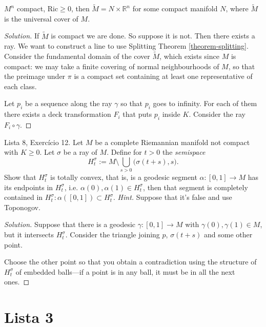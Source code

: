 \begin{exercise}
\label{exercise-product-of-compact-and-Rn}
$M^n$ compact, $\text{Ric} \geq 0$, then $\tilde{M}=N \times \mathbb{R}^n$ for
some compact manifold $N$, where  $\tilde{M}$ is the universal cover of $M$.
\end{exercise}

\begin{proof}[Solution]
If $\tilde{M}$ is compact we are done. So suppose it is not. Then there exists a
ray. We want to construct a line to use Splitting Theorem \ref{theorem-splitting}.
Consider the fundamental domain of the cover $\tilde{M}$, which exists since
$M$ is compact: we may take a finite covering of normal neighbourhoods of $M$,
so that the preimage under $\pi$ is a compact set containing at least one
representative of each class.

Let $p_i$ be a sequence along the ray $\gamma$ so that $p_i$ goes to infinity.
For each of them there exists a deck transformation $F_i$ that puts $p_i$ inside
$K$. Consider the ray $F_i \circ \gamma$.
\end{proof}

\begin{exercise}
\label{exercise-rays-semispaces}
Lista 8, Exercício 12. Let $M$ be a complete Riemannian manifold not compact
with $K \geq 0$. Let $\sigma$ be a ray of $M$. Define for $t>0$ the {\it
semispace}
$$
H_t^{\sigma}:=M\setminus \bigcup_{s>0}\Big(\sigma(t+s),s).
$$
Show that $H_t^{\sigma}$ is totally convex, that is, is a geodesic segment 
 $\alpha:[0,1]\to M$ has its endpoints in $H_t^{\sigma}$, i.e.
$\alpha(0),\alpha(1) \in H_t^{\sigma}$, then that segment is completely
contained in $H_t^{\sigma}:\alpha([0,1]) \subset H_t^{\sigma}$. {\it Hint.}
Suppose that it's false and use Toponogov.
\end{exercise}

\begin{proof}[Solution]
Suppose that there is a geodesic $\gamma:[0,1]\to M$ with $\gamma(0),\gamma(1)
\in M$, but it intersects $H_t^{\sigma}$. Consider the triangle joining $p$,
$\sigma(t+s)$ and some other point.

Choose the other point so that you obtain a contradiction using the structure of
$H_t^{\sigma}$ of embedded balls---if a point is in any ball, it must be in all
the next ones.
\end{proof}

\section{Lista 3}
\label{section-lista-3}

